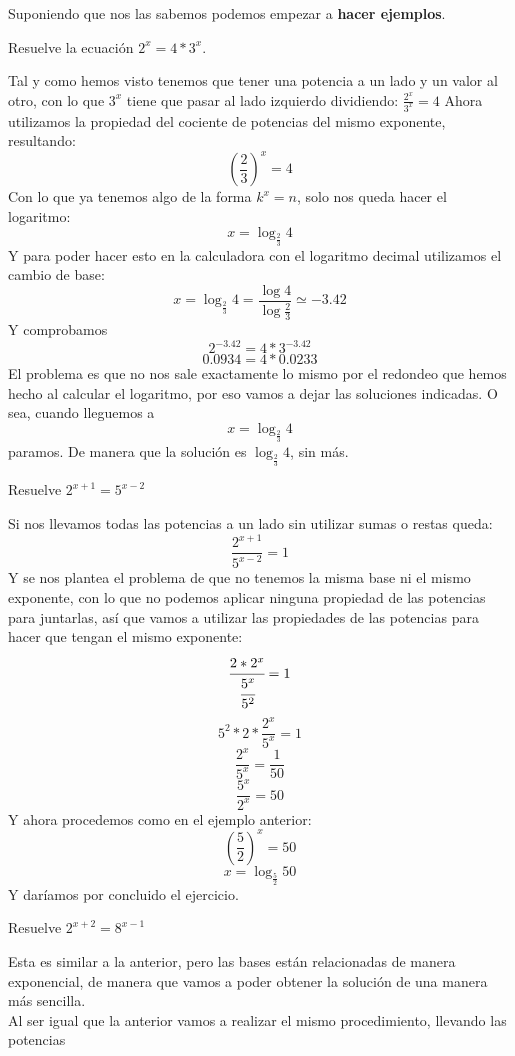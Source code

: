 \documentclass[a4paper,11pt,answers]{exam}
\begin{document}
\begin{itemize}
  Suponiendo que nos las sabemos podemos empezar a \textbf{hacer ejemplos}.
  \begin{questions}
  \question Resuelve la ecuación $2^x = 4*3^x$.
    \begin{solution}
      Tal y como hemos visto tenemos que tener una potencia a un lado y un valor al otro, con
      lo que $3^x$ tiene que pasar al lado izquierdo dividiendo:
      $\frac{2^x}{3^x} = 4$
      Ahora utilizamos la propiedad del cociente de potencias del mismo exponente, resultando:
      \[\left(\frac{2}{3}\right)^x = 4\]
      Con lo que ya tenemos algo de la forma $k^x = n$, solo nos queda hacer el logaritmo:
      \[x = \log_{\frac{2}{3}} 4\]
      Y para poder hacer esto en la calculadora con el logaritmo decimal utilizamos el cambio de
      base:
      \[x = \log_{\frac{2}{3}} 4 = \frac{\log 4}{\log \frac{2}{3}} \simeq -3.42\]
      Y comprobamos
      \[2^{-3.42} = 4*3^{-3.42}\]
      \[0.0934 = 4*0.0233\]
      El problema es que no nos sale exactamente lo mismo por el redondeo que hemos hecho al
      calcular el logaritmo, por eso vamos a dejar las soluciones indicadas. O sea, cuando
      lleguemos a
      \[x = \log_{\frac{2}{3}} 4\]
      paramos. De manera que la solución es $\log_{\frac{2}{3}} 4$, sin más.
    \end{solution}
  \question Resuelve $2^{x+1} = 5^{x-2}$
    \begin{solution}
      Si nos llevamos todas las potencias a un lado sin utilizar sumas o restas queda:
      \[\frac{2^{x+1}}{5^{x-2}} = 1\]
      Y se nos plantea el problema de que no tenemos la misma base ni el mismo exponente,
      con lo que no podemos aplicar ninguna propiedad de las potencias para juntarlas, así que
      vamos a utilizar las propiedades de las potencias para hacer que tengan el mismo exponente:
      \[\cfrac{2*2^x}{\cfrac{5^x}{5^2}} = 1\]
      \[5^2*2*\frac{2^x}{5^x} = 1\]
      \[\frac{2^x}{5^x} = \frac{1}{50}\]
      \[\frac{5^x}{2^x} = 50\]
      Y ahora procedemos como en el ejemplo anterior:
      \[\left(\frac{5}{2}\right)^x = 50\]
      \[x = \log_{\frac{5}{2}} 50\]
      Y daríamos por concluido el ejercicio.
    \end{solution}
  \question Resuelve $2^{x +2} = 8^{x-1}$
    \begin{solution}
      Esta es similar a la anterior, pero las bases están relacionadas de manera exponencial,
      de manera que vamos a poder obtener la solución de una manera más sencilla.\\
      Al ser igual que la anterior vamos a realizar el mismo procedimiento, llevando las potencias

\end{solution}
\end{questions}
\end{itemize}
\end{document}
